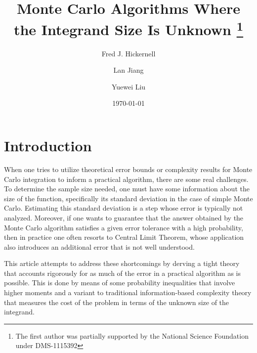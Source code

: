\documentclass[graybox]{svmult}
\begin{document}
\date{\today}
\title*{Monte Carlo Algorithms Where the Integrand Size Is Unknown
\thanks{The first author was partially supported by the National
Science Foundation under DMS-1115392}}
\author{Fred J. Hickernell \and
Lan Jiang \and Yuewei Liu}
%
%
\maketitle



\section{Introduction}

When one tries to utilize theoretical error bounds or complexity results for Monte Carlo integration to inform a practical algorithm, there are some real challenges.  To determine the sample size needed, one must have some information about the size of the function, specifically its standard deviation in the case of simple Monte Carlo.  Estimating this standard deviation is a step whose error is typically not analyzed.  Moreover, if one wants to guarantee that the answer obtained by the Monte Carlo algorithm satisfies a given error tolerance with a high probability, then in practice one often resorts to Central Limit Theorem, whose application also introduces an additional error that is not well understood.  

This article attempts to address these shortcomings by derving a tight theory that accounts rigorously for as much of the error in a practical algorithm as is possible.  This is done by means of some probability inequalities that involve higher moments and a variant to traditional information-based complexity theory that measures the cost of the problem in terms of the unknown size of the integrand.  
\end{document}
